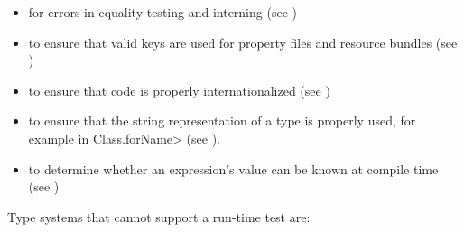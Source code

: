 \begin{itemize}
\item
   for errors in equality
  testing and interning (see )
\item
   to ensure that valid
  keys are used for property files and resource bundles (see
  )
\item
   to
  ensure that code is properly internationalized (see
  )
\item
   to ensure that the
  string representation of a type is properly used, for example in
  \<Class.forName> (see ).
\item
   to determine
  whether an expression's value can be known at compile time
  (see )
\end{itemize}


Type systems that cannot support a run-time test are:

